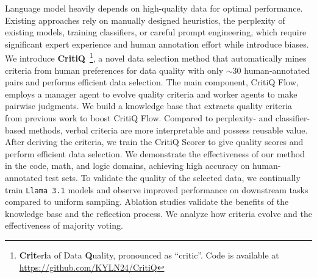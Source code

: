 Language model heavily depends on high-quality data for
optimal performance. Existing approaches rely on manually designed heuristics, the perplexity of existing models, training classifiers, or
careful prompt engineering, which require significant expert experience and human annotation effort while
introduce biases. We introduce \textbf{CritiQ}~\footnote{\textbf{Crit}er\textbf{i}a
of Data \textbf{Q}uality, pronounced as ``critic''. Code is available at \url{https://github.com/KYLN24/CritiQ}}, a novel data selection method that
automatically mines criteria from human preferences for data quality with only $\sim$30 human-annotated
pairs and performs efficient data selection. The main component, CritiQ Flow, employs a manager agent to evolve
quality criteria and worker agents to make pairwise judgments. We build a knowledge
base that extracts quality criteria from previous work to boost CritiQ Flow. Compared to perplexity- and classifier- based methods, verbal criteria are more interpretable and possess reusable value. After deriving the criteria, we train the CritiQ Scorer to give quality scores and
perform efficient data selection. We demonstrate the effectiveness of our method
in the code, math, and logic domains, achieving high accuracy on human-annotated test
sets. To validate the quality of the selected data, we continually train
\texttt{Llama 3.1} models and observe improved performance on downstream tasks compared
to uniform sampling. Ablation studies validate the benefits of the knowledge
base and the reflection process. We analyze how criteria evolve and the effectiveness
of majority voting.
